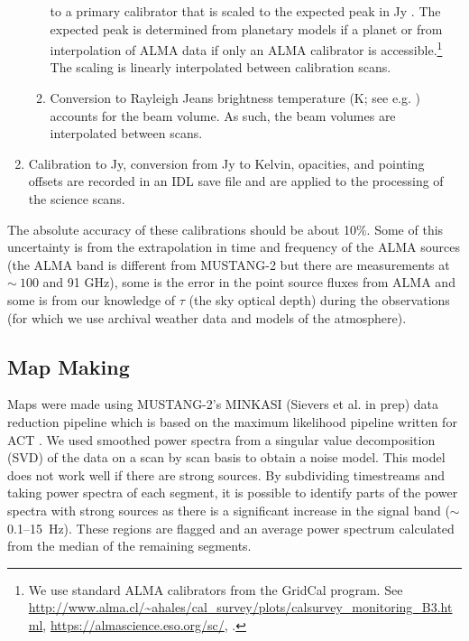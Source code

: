 \documentclass[twocolumn]{aastex62}
\def\todo#1{{\textcolor{red}{TODO: #1}}}
\newcommand{\MUSTANG}{MUSTANG-2\xspace}
\begin{document}
\begin{enumerate}
\begin{enumerate}
                to a primary calibrator that is scaled to the expected
                peak in Jy \perbeam.  The expected peak is determined from
                planetary models if a planet or from interpolation of ALMA data
                if only an ALMA calibrator is accessible.\footnote{We use
                standard ALMA calibrators from the GridCal program.  See
                \url{http://www.alma.cl/~ahales/cal_survey/plots/calsurvey_monitoring_B3.html},
                \url{https://almascience.eso.org/sc/}, \cite{vanKempen2014}.}
                The scaling is
                linearly interpolated between calibration scans.
            \item Conversion to Rayleigh Jeans brightness temperature (K; see e.g. \citealt{Condon2016a}) accounts for the beam volume. As such,
                the beam volumes are interpolated between scans.
        \end{enumerate}
    \item Calibration to Jy, conversion from Jy \perbeam to Kelvin, opacities,
        and pointing offsets are recorded in an IDL save file and are
        applied to the processing of the science scans.
\end{enumerate}

The absolute accuracy of these calibrations should be about 10\%.
Some of this uncertainty is from the extrapolation in time and frequency of the ALMA
sources (the ALMA band is different from \MUSTANG but there are measurements at
$\sim~100$ and 91 GHz), some is the error in the point source fluxes from ALMA and
some is from our knowledge of $\tau$ (the sky optical depth) during the observations (for which we use archival weather data and models of the atmosphere). 

\subsection{Map Making}
Maps were made using \MUSTANG's MINKASI (Sievers et al. in prep) data reduction
pipeline which is based on the maximum likelihood pipeline written for ACT \cite{Dunner2013a}.
We used smoothed power spectra from a singular value decomposition (SVD) of the
data on a scan by scan basis to obtain a noise model.
This model does not work well if there are strong sources.
By subdividing timestreams and taking power spectra of each segment, it is
possible to identify parts of the power spectra with strong sources as there is
a significant increase in the signal band ($\sim$0.1--15~Hz). These regions are
flagged and an average power spectrum calculated from the median of the
remaining segments. 
\end{document}
